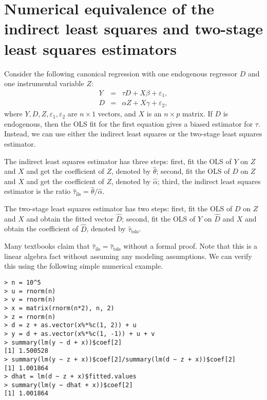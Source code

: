 \documentclass[11pt]{article}
\theoremstyle{definition}
\begin{document}
\doublespacing


\section{Numerical equivalence of the indirect least squares and two-stage least squares estimators}


Consider the following canonical regression with one endogenous regressor $D$ and one instrumental variable $Z$:
\begin{eqnarray*}
Y &=& \tau D + X \beta + \varepsilon_1,\\
D &=& \alpha  Z + X\gamma  +  \varepsilon_2,
\end{eqnarray*}
where $Y, D, Z, \varepsilon_1, \varepsilon_2$ are $n\times 1$ vectors, and $X$ is an $n\times p$ matrix. If $D$ is endogenous, then the OLS fit for the first equation gives a biased estimator for $\tau$. Instead, we can use either the indirect least squares or the two-stage least squares estimator. 

The indirect least squares estimator has three steps: first, fit the OLS of $Y$ on $Z$ and $X$ and get the coefficient of $Z$, denoted by $\hat{\theta}$; second, fit the OLS of $D$ on $Z$ and $X$ and get the coefficient of $Z$, denoted by $\hat{\alpha}$; third, the indirect least squares estimator is the ratio $ \hat{\tau}_{\text{ils}} =  \hat{\theta} / \hat{\alpha}.$ 



The two-stage least squares estimator has two steps: first, fit the OLS of $D$ on $Z$ and $X$ and obtain the fitted vector $\hat{D}$; second, fit the OLS of $Y$ on $\hat{D}$ and $X$ and obtain the coefficient of $\hat{D}$, denoted by $\hat{\tau}_{\text{tsls}}$. 

Many textbooks claim that $ \hat{\tau}_{\text{ils}}  = \hat{\tau}_{\text{tsls}}$ without a formal proof. Note that this is a linear algebra fact without assuming any modeling assumptions. We can verify this using the following simple numerical example. 


\begin{verbatim}
> n = 10^5
> u = rnorm(n)
> v = rnorm(n)
> x = matrix(rnorm(n*2), n, 2)
> z = rnorm(n)
> d = z + as.vector(x%*%c(1, 2)) + u
> y = d + as.vector(x%*%c(1, -1)) + u + v
> summary(lm(y ~ d + x))$coef[2]
[1] 1.500528
> summary(lm(y ~ z + x))$coef[2]/summary(lm(d ~ z + x))$coef[2]
[1] 1.001864
> dhat = lm(d ~ z + x)$fitted.values
> summary(lm(y ~ dhat + x))$coef[2]
[1] 1.001864
\end{verbatim}
\end{document}
